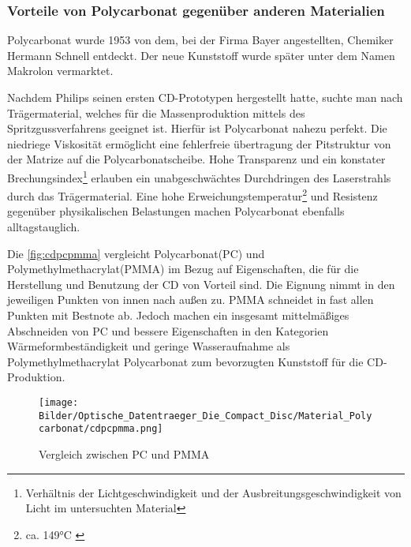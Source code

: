 \subsubsection{Vorteile von Polycarbonat gegenüber anderen Materialien}

Polycarbonat wurde 1953 von dem, bei der Firma Bayer angestellten, Chemiker
Hermann Schnell entdeckt. Der neue Kunststoff wurde später unter dem Namen
Makrolon\textsuperscript{\textregistered} vermarktet. \cite{cuzpc}

Nachdem Philips seinen ersten CD-Prototypen hergestellt hatte, suchte man nach
Trägermaterial, welches für die Massenproduktion mittels des
Spritzgussverfahrens geeignet ist. Hierfür ist Polycarbonat nahezu perfekt. Die
niedriege Viskosität ermöglicht eine fehlerfreie übertragung der Pitstruktur von
der Matrize auf die Polycarbonatscheibe. Hohe Transparenz und ein konstater
Brechungsindex\footnote{Verhältnis der Lichtgeschwindigkeit und der
Ausbreitungsgeschwindigkeit von Licht im untersuchten Material} erlauben ein
unabgeschwächtes Durchdringen des Laserstrahls durch das Trägermaterial. Eine
hohe Erweichungstemperatur\footnote{ca. 149°C \cite{cuzpc2}} und Resistenz
gegenüber physikalischen Belastungen machen Polycarbonat ebenfalls
alltagstauglich. \cite{cfcd}

Die \autoref{fig:cdpcpmma} vergleicht Polycarbonat(PC) und
Polymethylmethacrylat(PMMA) im Bezug auf Eigenschaften, die für die Herstellung
und Benutzung der CD von Vorteil sind. Die Eignung nimmt in den jeweiligen
Punkten von innen nach außen zu. PMMA schneidet in fast allen Punkten mit
Bestnote ab. Jedoch machen ein insgesamt mittelmäßiges Abschneiden von PC und
bessere Eigenschaften in den Kategorien Wärmeformbeständigkeit und geringe
Wasseraufnahme als Polymethylmethacrylat Polycarbonat zum bevorzugten Kunststoff
für die CD-Produktion.

\begin{figure}[h]
    \begin{center}
        \begin{minipage}[t]{\textwidth}
            \begin{center}
                \texttt{[image: Bilder/Optische\_Datentraeger\_Die\_Compact\_Disc/Material\_Polycarbonat/cdpcpmma.png]}
                \caption[Vergleich zwischen PC und PMMA \newline Roth, Klaus: CD, DVD \& Co.: Die Chemie der schillernden Scheiben, in: Chemie in unserer Zeit (41/2007), S. 337]{Vergleich zwischen PC und PMMA}
                \label{fig:cdpcpmma}
            \end{center}
        \end{minipage}
    \end{center}
\end{figure}
